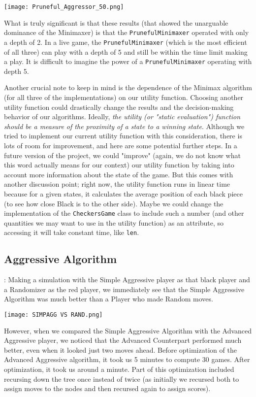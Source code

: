 \documentclass[fontsize=11pt]{article}
\begin{document}
\texttt{[image: Pruneful\_Aggressor\_50.png]}


What is truly significant is that these results (that showed the unarguable dominance of the Minimaxer) is that the \texttt{PrunefulMinimaxer} operated with only a depth of 2. In a live game, the \texttt{PrunefulMinimaxer} (which is the most efficient of all three) can play with a depth of 5 and still be within the time limit making a play. It is difficult to imagine the power of a \texttt{PrunefulMinimaxer} operating with depth 5.

Another crucial note to keep in mind is the dependence of the Minimax algorithm (for all three of the implementations) on our utility function. Choosing another utility function could drastically change the results and the decision-making behavior of our algorithms. Ideally, \textit{the utility (or "static evaluation") function should be a measure of the proximity of a state to a winning state}. Although we tried to implement our current utility function with this consideration, there is lots of room for improvement, and here are some potential further steps. In a future version of the project, we could "improve" (again, we do not know what this word actually means for our context) our utility function by taking into account more information about the state of the game. But this comes with another discussion point; right now, the utility function runs in linear time because for a given states, it calculates the average position of each black piece (to see how close Black is to the other side). Maybe we could change the implementation of the \texttt{CheckersGame} class to include such a number (and other quantities we may want to use in the utility function) as an attribute, so accessing it will take constant time, like \texttt{len}.

\subsection*{Aggressive Algorithm}:
Making a simulation with the Simple Aggressive player as that black player and a Randomizer as the red player, we immediately see that the Simple Aggressive Algorithm was much better than a Player who made Random moves.

\texttt{[image: SIMPAGG VS RAND.png]}

However, when we compared the Simple Aggressive Algorithm with the Advanced Aggressive player, we noticed that the Advanced Counterpart performed much better, even when it looked just two moves ahead. Before optimization of the Advanced Aggressive algorithm, it took us 5 minutes to compute 30 games. After optimization, it took us around a minute. Part of this optimization included recursing down the tree once instead of twice (as initially we recursed both to assign moves to the nodes and then recursed again to assign scores). 
\end{document}

